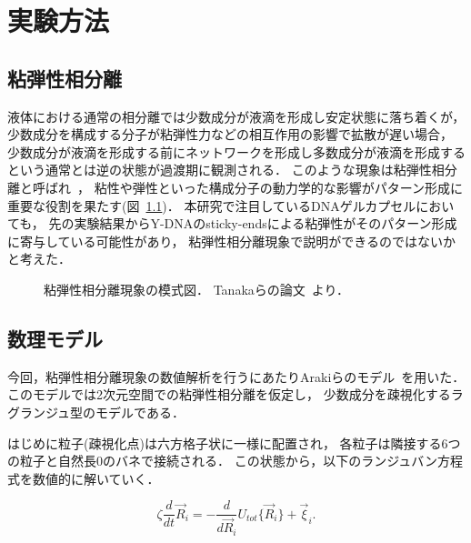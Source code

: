 \chapter{実験方法}

\section{粘弾性相分離}
液体における通常の相分離では少数成分が液滴を形成し安定状態に落ち着くが，
少数成分を構成する分子が粘弾性力などの相互作用の影響で拡散が遅い場合，
少数成分が液滴を形成する前にネットワークを形成し多数成分が液滴を形成するという通常とは逆の状態が過渡期に観測される．
このような現象は粘弾性相分離と呼ばれ~\cite{tanaka2009formation}，
粘性や弾性といった構成分子の動力学的な影響がパターン形成に重要な役割を果たす(図~\ref{fig:veps})．
本研究で注目しているDNAゲルカプセルにおいても，
先の実験結果からY-DNAのsticky-endsによる粘弾性がそのパターン形成に寄与している可能性があり，
粘弾性相分離現象で説明ができるのではないかと考えた．

\begin{figure}
\centering

\caption{
    粘弾性相分離現象の模式図．
    Tanakaらの論文~\cite{tanaka2009formation}より．
}

\label{fig:veps}
\end{figure}

\section{数理モデル}
今回，粘弾性相分離現象の数値解析を行うにあたりArakiらのモデル~\cite{araki2005simple}を用いた．
このモデルでは2次元空間での粘弾性相分離を仮定し，
少数成分を疎視化するラグランジュ型のモデルである．

はじめに粒子(疎視化点)は六方格子状に一様に配置され，
各粒子は隣接する6つの粒子と自然長$0$のバネで接続される．
この状態から，以下のランジュバン方程式を数値的に解いていく．

\begin{equation}
\label{eq_main}
\zeta
\frac{d}{dt}
\vec{R}_i
=
-\frac{d}{d\vec{R}_i}
U_{tot}\{\vec{R}_i\}
+\vec{\xi}_i
.
\end{equation}

